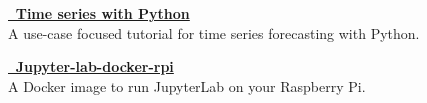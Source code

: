 \textcolor{SlateGrey}{\textbf{\href{https://github.com/jiwidi/time-series-forecasting-with-python}{\faGithub \,  Time series with Python  }}} \\ 
A use-case focused tutorial for time series forecasting with Python.
\newline
\vspace{1pt}


\textcolor{SlateGrey}{\textbf{\href{https://github.com/jiwidi/jupyter-lab-docker-rpi}{\faGithub \, Jupyter-lab-docker-rpi}}} \\ 
A Docker image to run JupyterLab on your Raspberry Pi. 
\newline
\vspace{1pt}
